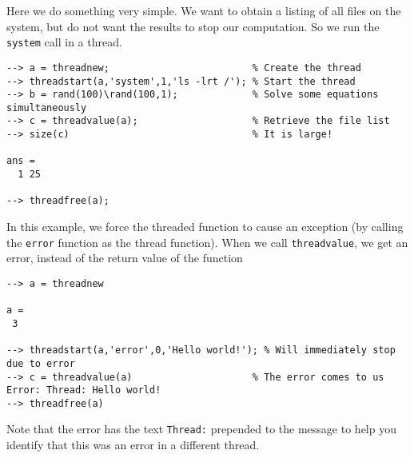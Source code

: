 Here we do something very simple.  We want to obtain a listing of
all files on the system, but do not want the results to stop our
computation.  So we run the \verb|system| call in a thread.
\begin{verbatim}
--> a = threadnew;                         % Create the thread
--> threadstart(a,'system',1,'ls -lrt /'); % Start the thread
--> b = rand(100)\rand(100,1);             % Solve some equations simultaneously
--> c = threadvalue(a);                    % Retrieve the file list
--> size(c)                                % It is large!

ans = 
  1 25 

--> threadfree(a);
\end{verbatim}
In this example, we force the threaded function to cause an
exception (by calling the \verb|error| function as the thread 
function).  When we call \verb|threadvalue|, we get an error, instead
of the return value of the function
\begin{verbatim}
--> a = threadnew

a = 
 3 

--> threadstart(a,'error',0,'Hello world!'); % Will immediately stop due to error
--> c = threadvalue(a)                     % The error comes to us
Error: Thread: Hello world!
--> threadfree(a)
\end{verbatim}
Note that the error has the text \verb|Thread:| prepended to the message
to help you identify that this was an error in a different thread.
